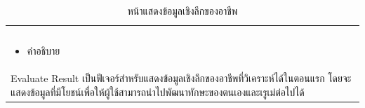 \begin{table}[H]
\begin{tabular}{|l|}
\begin{minipage}{\linewidth}
  \caption{\centering หน้าแสดงข้อมูลเชิงลึกของอาชีพ}\label{fig:wireframe3_1}
\end{minipage} \\                                                                                                                                                                                                                                                                                                                                    \\ \hline
\begin{minipage}{\linewidth}
  \begin{itemize}
    \item คำอธิบาย
  \end{itemize}
\end{minipage}                                                                                                                                                                                                                                                                                                                                                                                                                                                                                                                                 \\ \hline
\begin{minipage}{\linewidth}
  \raggedright
Evaluate Result เป็นฟีเจอร์สำหรับแสดงข้อมูลเชิงลึกของอาชีพที่วิเคราะห์ได้ในตอนแรก โดยจะแสดงข้อมูลที่มีโยชน์เพื่อให้ผู้ใช้สามารถนำไปพัฒนาทักษะของตนเองและเรูเม่ต่อไปได้
\end{minipage}
\\ \hline
\end{tabular}
\end{table}


